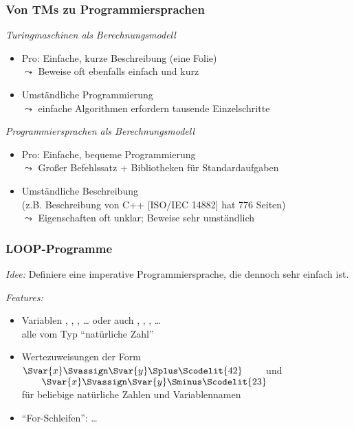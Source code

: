 \documentclass[aspectratio=1610,onlymath]{beamer}
\begin{document}
\begin{frame}\frametitle{Von TMs zu Programmiersprachen}

\emph{Turingmaschinen als Berechnungsmodell}
\begin{itemize}
\item \alert{Pro:} Einfache, kurze Beschreibung (eine Folie)\\
	$\leadsto$ Beweise oft ebenfalls einfach und kurz
\item {} Umständliche Programmierung\\
	$\leadsto$ einfache Algorithmen erfordern tausende Einzelschritte
\end{itemize}
\bigskip\pause

\emph{Programmiersprachen als Berechnungsmodell}
\begin{itemize}
\item \alert{Pro:} Einfache, bequeme Programmierung\\
	$\leadsto$ Großer Befehlssatz + Bibliotheken für Standardaufgaben
\item {} Umständliche Beschreibung\\
	(z.B. Beschreibung von C++ [ISO/IEC 14882] hat 776 Seiten)\\
	$\leadsto$ Eigenschaften oft unklar; Beweise sehr umständlich
\end{itemize}

\end{frame}

\begin{frame}\frametitle{LOOP-Programme}

\emph{Idee:} Definiere eine imperative Programmiersprache, die dennoch sehr einfach ist.
\bigskip

\emph{Features:}
\begin{itemize}
\item Variablen , , , \ldots{} oder auch , , , \ldots\\
alle vom Typ ``natürliche Zahl''
\item Wertezuweisungen der Form\\[1ex]
\mbox{}\hfill%
$\Svar{x} \Svassign \Svar{y} \Splus \Scodelit{42}\qquad$ und $\qquad\Svar{x} \Svassign \Svar{y} \Sminus \Scodelit{23}$\hfill\mbox{}\\[1ex]
%
für beliebige natürliche Zahlen und Variablennamen
\item ``For-Schleifen'':  \ldots{} \SEndLoop
\end{itemize}

\end{frame}
\end{document}
